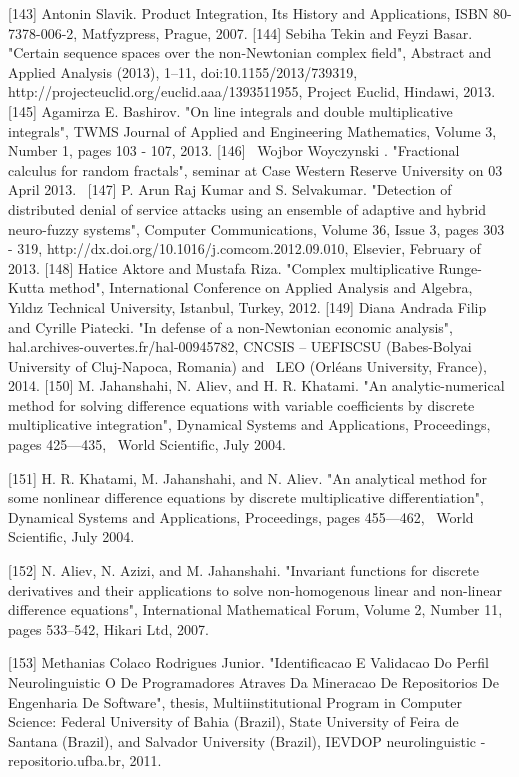 \documentclass[12pt]{article}
\begin{document}
[143] Antonin Slavik. Product Integration, Its History and Applications, ISBN 80-7378-006-2, Matfyzpress, Prague, 2007.
[144] Sebiha Tekin and Feyzi Basar. "Certain sequence spaces over the non-Newtonian complex field", Abstract and Applied Analysis (2013), 1--11, doi:10.1155/2013/739319, http://projecteuclid.org/euclid.aaa/1393511955, Project Euclid, Hindawi, 2013.
[145] Agamirza E. Bashirov. "On line integrals and double multiplicative integrals", TWMS Journal of Applied and Engineering Mathematics, Volume 3, Number 1, pages 103 - 107, 2013.
[146]  Wojbor Woyczynski . "Fractional calculus for random fractals", seminar at Case Western Reserve University on 03 April 2013. 
[147] P. Arun Raj Kumar and S. Selvakumar. "Detection of distributed denial of service attacks using an ensemble of adaptive and hybrid neuro-fuzzy systems", Computer Communications, Volume 36, Issue 3, pages 303 - 319, http://dx.doi.org/10.1016/j.comcom.2012.09.010, Elsevier, February of 2013.
[148] Hatice Aktore and Mustafa Riza. "Complex multiplicative Runge-Kutta method", International Conference on Applied Analysis and Algebra, Yıldız Technical University, Istanbul, Turkey, 2012.
[149] Diana Andrada Filip and Cyrille Piatecki. "In defense of a non-Newtonian economic analysis", hal.archives-ouvertes.fr/hal-00945782, CNCSIS – UEFISCSU (Babes-Bolyai University of Cluj-Napoca, Romania) and  LEO (Orléans University, France), 2014.
[150] M. Jahanshahi, N. Aliev, and H. R. Khatami. "An analytic-numerical method for solving difference equations with variable coefficients by discrete multiplicative integration", Dynamical Systems and Applications, Proceedings, pages 425—435,  World Scientific, July 2004.      

[151] H. R. Khatami, M. Jahanshahi, and N. Aliev. "An analytical method for some nonlinear difference equations by discrete multiplicative differentiation", Dynamical Systems and Applications, Proceedings, pages 455—462,  World Scientific, July 2004.         

[152] N. Aliev, N. Azizi, and M. Jahanshahi. "Invariant functions for discrete derivatives and their applications to solve non-homogenous linear and non-linear difference equations", International Mathematical Forum, Volume 2, Number 11, pages 533–542, Hikari Ltd, 2007.      

[153] Methanias Colaco Rodrigues Junior. "Identificacao E Validacao Do Perfil Neurolinguistic O De Programadores Atraves Da Mineracao De Repositorios De Engenharia De Software", thesis, Multiinstitutional Program in Computer Science: Federal University of Bahia (Brazil), State University of Feira de Santana (Brazil), and Salvador University (Brazil), IEVDOP neurolinguistic - repositorio.ufba.br, 2011.
\end{document}
